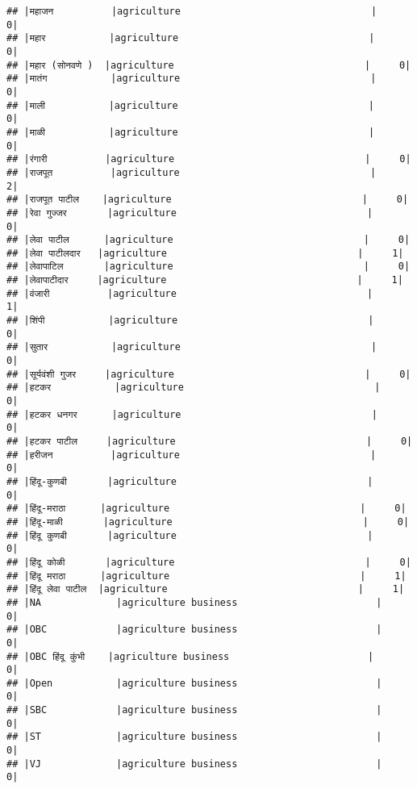 \documentclass[
]{article}
\begin{document}
\begin{verbatim}
## |महाजन          |agriculture                                 |     0|
## |महार           |agriculture                                 |     0|
## |महार (सोनवणे )  |agriculture                                 |     0|
## |मातंग           |agriculture                                 |     0|
## |माली           |agriculture                                 |     0|
## |माळी           |agriculture                                 |     0|
## |रंगारी          |agriculture                                 |     0|
## |राजपूत          |agriculture                                 |     2|
## |राजपूत पाटील    |agriculture                                 |     0|
## |रेवा गुज्जर       |agriculture                                 |     0|
## |लेवा पाटील      |agriculture                                 |     0|
## |लेवा पाटीलदार   |agriculture                                 |     1|
## |लेवापाटिल       |agriculture                                 |     0|
## |लेवापाटीदार     |agriculture                                 |     1|
## |वंजारी          |agriculture                                 |     1|
## |शिंपी           |agriculture                                 |     0|
## |सुतार           |agriculture                                 |     0|
## |सूर्यवंशी गुजर     |agriculture                                 |     0|
## |हटकर           |agriculture                                 |     0|
## |हटकर धनगर      |agriculture                                 |     0|
## |हटकर पाटील     |agriculture                                 |     0|
## |हरीजन          |agriculture                                 |     0|
## |हिंदू-कुणबी       |agriculture                                 |     0|
## |हिंदू-मराठा      |agriculture                                 |     0|
## |हिंदू-माळी       |agriculture                                 |     0|
## |हिंदू कुणबी       |agriculture                                 |     0|
## |हिंदू कोळी       |agriculture                                 |     0|
## |हिंदू मराठा      |agriculture                                 |     1|
## |हिंदू लेवा पाटील  |agriculture                                 |     1|
## |NA             |agriculture business                        |     0|
## |OBC            |agriculture business                        |     0|
## |OBC हिंदू कुंभी    |agriculture business                        |     0|
## |Open           |agriculture business                        |     0|
## |SBC            |agriculture business                        |     0|
## |ST             |agriculture business                        |     0|
## |VJ             |agriculture business                        |     0|

\end{verbatim}
\end{document}
